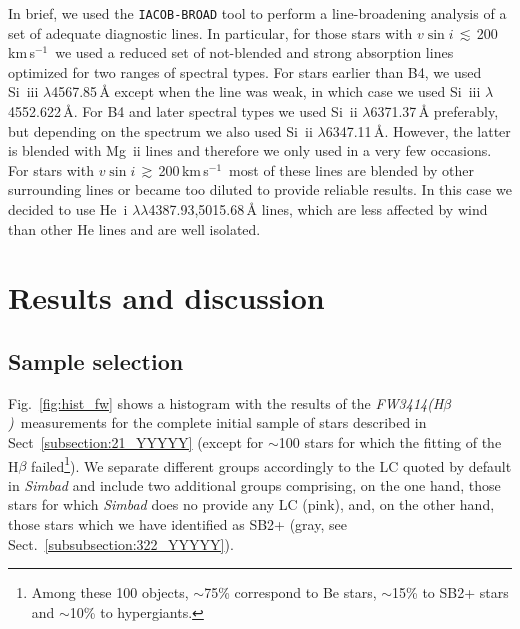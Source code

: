 \documentclass{aa}
\newcommand{\kms}{\mbox{km\,s$^{-1}$}}
\newcommand{\vsini}{\mbox{$v\sin i$}}
\newcommand{\ls}{\mbox{$\lesssim$}}
\newcommand{\gs}{\mbox{$\gtrsim$}}
\newcommand{\fwhb}{\textit{FW3414(H$\beta$)}}
\begin{document}
In brief, we used the {\tt IACOB-BROAD} tool to perform a line-broadening analysis of a set of adequate diagnostic lines. In particular, for those stars with \vsini\,\ls\,200\,\kms\ we used a reduced set of not-blended and strong absorption lines optimized for two ranges of spectral types. For stars earlier than B4, we used Si~{\sc iii} $\lambda$4567.85\,{\AA} except when the line was weak, in which case we used Si~{\sc iii} $\lambda$4552.622\,{\AA}. For B4 and later spectral types we used Si~{\sc ii} $\lambda$6371.37\,{\AA} preferably, but depending on the spectrum we also used Si~{\sc ii} $\lambda$6347.11\,{\AA}. However, the latter is blended with Mg~{\sc ii} lines and therefore we only used in a very few occasions. For stars with \vsini\,\gs\,200\,\kms\ most of these lines are blended by other surrounding lines or became too diluted to provide reliable results. In this case we decided to use He~{\sc i} $\lambda\lambda$4387.93,5015.68\,{\AA} lines, which are less affected by wind than other He lines and are well isolated. 






\section{Results and discussion}
\label{section:4_ZZZZZ}




\subsection{Sample selection}
\label{subsection:41_YYYYY}

Fig.~\ref{fig:hist_fw} shows a histogram with the results of the \fwhb\ measurements for the complete initial sample of stars described in Sect~\ref{subsection:21_YYYYY} (except for $\sim$100 stars for which the fitting of the H$\beta$ failed\footnote{Among these 100 objects, $\sim$75\% correspond to Be stars, $\sim$15\% to SB2+ stars and $\sim$10\% to hypergiants.}). We separate different groups accordingly to the LC quoted by default in \textit{Simbad} and include two additional groups comprising, on the one hand, those stars for which \textit{Simbad} does no provide any LC (pink), and, on the other hand, those stars which we have identified as SB2+ (gray, see Sect.~\ref{subsubsection:322_YYYYY}).
\end{document}
